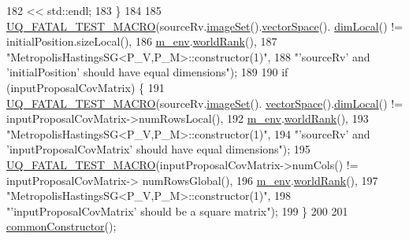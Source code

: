 \begin{DoxyCode}
182                             << std::endl;
183   \}
184 
185   \hyperlink{_defines_8h_a56d63d18d0a6d45757de47fcc06f574d}{UQ\_FATAL\_TEST\_MACRO}(sourceRv.\hyperlink{class_q_u_e_s_o_1_1_base_vector_r_v_aa4dd2f036228eac1f945bacc7147a922}{imageSet}().\hyperlink{class_q_u_e_s_o_1_1_vector_set_a923421590baf5bf93cf066e528f927dc}{vectorSpace}().
      \hyperlink{class_q_u_e_s_o_1_1_vector_space_a5829a1f4f996f8307c840b705144d666}{dimLocal}() != initialPosition.sizeLocal(),
186                       \hyperlink{class_q_u_e_s_o_1_1_metropolis_hastings_s_g_ac8ea061e55b920e0c8f9bce5c3f20e52}{m\_env}.\hyperlink{class_q_u_e_s_o_1_1_base_environment_a78b57112bbd0e6dd0e8afec00b40ffa7}{worldRank}(),
187                       \textcolor{stringliteral}{"MetropolisHastingsSG<P\_V,P\_M>::constructor(1)"},
188                       \textcolor{stringliteral}{"'sourceRv' and 'initialPosition' should have equal dimensions"});
189 
190   \textcolor{keywordflow}{if} (inputProposalCovMatrix) \{
191     \hyperlink{_defines_8h_a56d63d18d0a6d45757de47fcc06f574d}{UQ\_FATAL\_TEST\_MACRO}(sourceRv.\hyperlink{class_q_u_e_s_o_1_1_base_vector_r_v_aa4dd2f036228eac1f945bacc7147a922}{imageSet}().
      \hyperlink{class_q_u_e_s_o_1_1_vector_set_a923421590baf5bf93cf066e528f927dc}{vectorSpace}().\hyperlink{class_q_u_e_s_o_1_1_vector_space_a5829a1f4f996f8307c840b705144d666}{dimLocal}() != inputProposalCovMatrix->numRowsLocal(),
192                         \hyperlink{class_q_u_e_s_o_1_1_metropolis_hastings_s_g_ac8ea061e55b920e0c8f9bce5c3f20e52}{m\_env}.\hyperlink{class_q_u_e_s_o_1_1_base_environment_a78b57112bbd0e6dd0e8afec00b40ffa7}{worldRank}(),
193                         \textcolor{stringliteral}{"MetropolisHastingsSG<P\_V,P\_M>::constructor(1)"},
194                         \textcolor{stringliteral}{"'sourceRv' and 'inputProposalCovMatrix' should have equal dimensions"});
195     \hyperlink{_defines_8h_a56d63d18d0a6d45757de47fcc06f574d}{UQ\_FATAL\_TEST\_MACRO}(inputProposalCovMatrix->numCols() != inputProposalCovMatrix->
      numRowsGlobal(),
196                         \hyperlink{class_q_u_e_s_o_1_1_metropolis_hastings_s_g_ac8ea061e55b920e0c8f9bce5c3f20e52}{m\_env}.\hyperlink{class_q_u_e_s_o_1_1_base_environment_a78b57112bbd0e6dd0e8afec00b40ffa7}{worldRank}(),
197                         \textcolor{stringliteral}{"MetropolisHastingsSG<P\_V,P\_M>::constructor(1)"},
198                         \textcolor{stringliteral}{"'inputProposalCovMatrix' should be a square matrix"});
199   \}
200 
201   \hyperlink{class_q_u_e_s_o_1_1_metropolis_hastings_s_g_a38f0ec3feee117f6abe20c0a806f9c0a}{commonConstructor}();

\end{DoxyCode}
